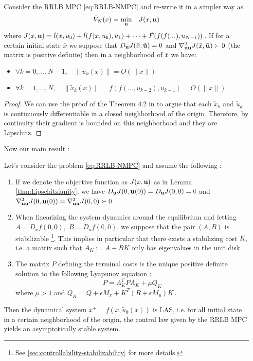 \documentclass[12pt]{article}
\begin{document}
\begin{lemma}
	\label{thm:Lipschitzianity}
	Consider the RRLB MPC \ref{eq:RRLB-NMPC} and re-write it in a simpler way as
	$$\tilde{V}_N(x)=\underset{\bf{u}}{\min} \quad J(x,\bf{u})$$
	where $J(x,\bf{u})=\tilde{l}(x,u_0)+\tilde{l}(f(x,u_0),u_1)+\dots+\tilde{F}(f(f(...),u_{N-1}))$\,.
	If for a certain initial state $\bar{x}$ we suppose that $D_\bf{u}J(\bar{x},\tilde{\bf{u}})=0$ and $\nabla_{\bf{u}\bf{u}}^2J(\bar{x}, \tilde{\bf{u}})\succ 0$ (the matrix is positive definite) then in a neighborhood of $\bar{x}$ we have:
	\begin{itemize}[label=\textbullet]
		\item $\forall k=0,\dots,N-1,\quad \|\tilde{u}_k(x)\|=O(\|x\|)$
		\item $\forall k=1,\dots,N,\quad \|\tilde{x}_k(x)\|=f(f(\dots,u_{k-2}),u_{k-1})=O(\|x\|)$
	\end{itemize}
\end{lemma}
\begin{proof}
	We can use the proof of the Theorem 4.2 in \cite{lectures-parametric-optimization} to argue that each $\tilde{x}_k$ and $\tilde{u}_k$ is continuously differentiable in a closed neighborhood of the origin.
	Therefore, by continuity their gradient is bounded on this neighborhood and they are Lipschitz.
\end{proof}

\noindent Now our main result :

\begin{theorem}\label{thm:nominal-stability}
	Let's consider the problem \ref{eq:RRLB-NMPC} and assume the following :
	\begin{enumerate}
		\item If we denote the objective function as $J(x,\bf{u})$ as in Lemma \ref{thm:Lipschitzianity}, we have $D_\bf{u}J(0,\bf{u}(0))=D_\bf{u}J(0,0)=0$ and $\nabla^2_{\bf{u}\bf{u}}J(0,\bf{u}(0))=\nabla^2_{\bf{u}\bf{u}}J(0,0)\succ 0$

		\item When linearizing the system dynamics around the equilibrium and letting $A=D_xf(0,0),$ $B=D_uf(0,0)$, we suppose that the pair $(A,B)$ is stabilizable \footnote{See \ref{sec:controllability-stabilizability} for more details.}.
		This implies in particular that there exists a stabilizing cost $K$, i.e. a matrix such that $A_K:=A+BK$ only has eigenvalues in the unit disk.

		\item The matrix $P$ defining the terminal costs is the unique positive definite solution to the following Lyapunov equation :
		\begin{equation*}
			P=A_K^TPA_K+\mu Q_K
		\end{equation*}
		where $\mu>1$ and $Q_K=Q+\epsilon M_x+K^T(R+\epsilon M_u)K$\,.
	\end{enumerate}
	Then the dynamical system $x^+=f(x,\tilde{u}_0(x))$ is LAS, i.e. for all initial state in a certain neighborhood of the origin, the control law given by the RRLB MPC yields an asymptotically stable system.
\end{theorem}
\end{document}
